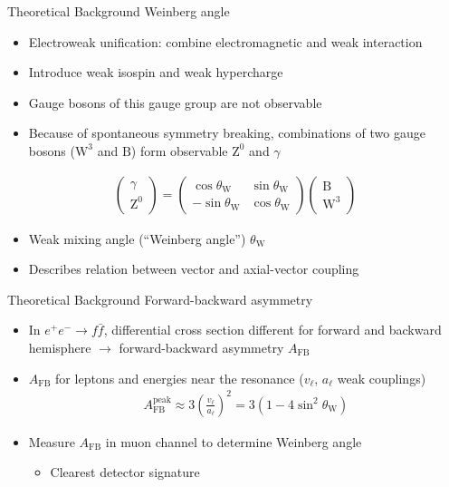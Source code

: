 \documentclass[11pt,xcolor=dvipsnames,professionalfonts]{beamer}
\begin{document}
\begin{frame}{Theoretical Background}
	Weinberg angle
	\begin{itemize}
		\item Electroweak unification: combine electromagnetic and weak interaction
		\item Introduce weak isospin and weak hypercharge
		\item Gauge bosons of this gauge group are not observable
		\item Because of spontaneous symmetry breaking, combinations of two gauge bosons ($\mathrm{W}^3$ and $\mathrm{B}$) form observable $\mathrm{Z}^0$ and $\gamma$
	\end{itemize}
	\begin{align*}
		\begin{pmatrix}
		\gamma \\
		\mathrm{Z}^0
		\end{pmatrix} = 
		\begin{pmatrix}
		\cos\theta_\mathrm{W} & \sin\theta_\mathrm{W} \\
		-\sin\theta_\mathrm{W} & \cos\theta_\mathrm{W}
		\end{pmatrix}
		\begin{pmatrix}
		\mathrm{B} \\
		\mathrm{W}^3
		\end{pmatrix}
	\end{align*}
	\begin{itemize}
		\item Weak mixing angle (``Weinberg angle'') $\theta_\mathrm{W}$
		\item Describes relation between vector and axial-vector coupling
	\end{itemize}
\end{frame}

\begin{frame}{Theoretical Background}
	Forward-backward asymmetry
	\begin{itemize}
		\item In $e^+e^- \rightarrow f\bar{f}$, differential cross section different for forward and backward hemisphere $\rightarrow$ forward-backward asymmetry $A_\mathrm{FB}$
		\item $A_\mathrm{FB}$ for leptons and energies near the resonance ($v_\ell$, $a_\ell$ weak couplings)
		\begin{align*}
			A_\mathrm{FB}^{\mathrm{peak}}\approx 3\left(\frac{v_\ell}{a_\ell}\right)^2 = 3\left( 1 - 4 \sin^2\theta_\mathrm{W} \right)
		\end{align*}
		\item Measure $A_\mathrm{FB}$ in muon channel to determine Weinberg angle
		\begin{itemize}
			\item Clearest detector signature
		\end{itemize}
	\end{itemize}
\end{frame}
\end{document}
